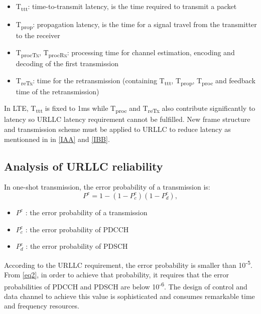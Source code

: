 \documentclass[conference]{IEEEtran}
\begin{document}
\begin{itemize}
\item T\textsubscript{ttt}: time-to-transmit latency, is the time required to transmit a packet
\item T\textsubscript{prop}: propagation latency, is the time for a signal travel from the transmitter to the receiver
\item T\textsubscript{procTx}, T\textsubscript{procRx}: processing time for channel estimation, encoding and decoding of the first transmission
\item T\textsubscript{reTx}: time for the retransmission (containing T\textsubscript{ttt}, T\textsubscript{prop}, T\textsubscript{proc} and feedback time of the retransmission) 
\end{itemize}

In LTE, T\textsubscript{ttt} is fixed to 1ms while T\textsubscript{proc} and T\textsubscript{reTx} also contribute significantly to latency so URLLC latency requirement cannot be fulfilled. New frame structure and transmission scheme must be applied to URLLC to reduce latency as mentionned in in \ref{IAA} and \ref{IBB}.  
\subsection{Analysis of URLLC reliability}
In one-shot transmission, the error probability of a transmission is:
\begin{equation}
P^{e} = 1 - (1 - P^{e}_{c})(1 - P^{e}_{d}),\label{eq2}
\end{equation}

\begin{itemize}
    \item $P^{e}$ : the error probability of a transmission
    \item $P^{e}_{c}$ : the error probability of PDCCH 
    \item $P^{e}_{d}$ : the error probability of PDSCH
\end{itemize}

According to the URLLC requirement, the error probability is smaller than 10\textsuperscript{-5}. From \eqref{eq2}, in order to achieve that probability, it requires that the error probabilities of PDCCH and PDSCH are below 10\textsuperscript{-6}. The design of control and data channel to achieve this value is sophisticated and consumes remarkable time and frequency resources.
\end{document}
